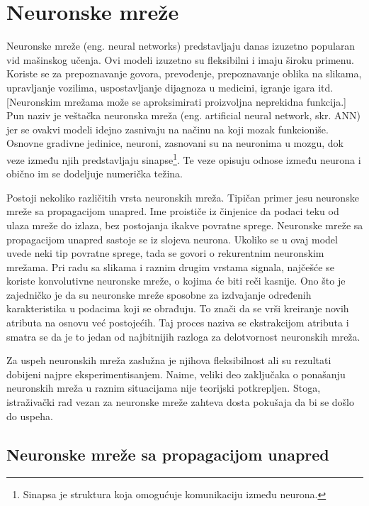 \chapter{Neuronske mreže}
\label{ch:nn}

Neuronske mreže (eng. \foreignlanguage{english}{neural networks}) predstavljaju danas izuzetno popularan vid mašinskog učenja. Ovi modeli izuzetno su fleksibilni i imaju široku primenu.  Koriste se za prepoznavanje govora, prevođenje, prepoznavanje oblika na slikama, upravljanje vozilima, uspostavljanje dijagnoza u medicini, igranje igara itd. [Neuronskim mrežama može se aproksimirati proizvoljna neprekidna funkcija.] Pun naziv je veštačka neuronska mreža (eng. artificial neural network, skr. ANN) jer se ovakvi modeli idejno zasnivaju na načinu na koji mozak funkcioniše. Osnovne gradivne jedinice, neuroni, zasnovani su na neuronima u mozgu, dok veze između njih predstavljaju sinapse\footnote{Sinapsa je struktura koja omogućuje komunikaciju između neurona.}. Te veze opisuju odnose između neurona i obično im se dodeljuje numerička težina.

\par
Postoji nekoliko različitih vrsta neuronskih mreža. Tipičan primer jesu neuronske mreže sa propagacijom unapred. Ime proističe iz činjenice da podaci teku od ulaza mreže do izlaza, bez postojanja ikakve povratne sprege. Neuronske mreže sa propagacijom unapred sastoje se iz slojeva neurona. Ukoliko se u ovaj model uvede neki tip povratne sprege, tada se govori o rekurentnim neuronskim mrežama. Pri radu sa slikama i raznim drugim vrstama signala, najčešće se koriste konvolutivne neuronske mreže, o kojima će biti reči kasnije. Ono što je zajedničko je da su neuronske mreže sposobne za izdvajanje određenih karakteristika u podacima koji se obrađuju. To znači da se vrši kreiranje novih atributa na osnovu već postojećih. Taj proces naziva se ekstrakcijom atributa i smatra se da je to jedan od najbitnijih razloga za delotvornost neuronskih mreža.
\par
Za uspeh neuronskih mreža zaslužna je njihova fleksibilnost ali su rezultati dobijeni najpre eksperimentisanjem. Naime, veliki deo zaključaka o ponašanju neuronskih mreža u raznim situacijama nije teorijski potkrepljen. Stoga, istraživački rad vezan za neuronske mreže zahteva dosta pokušaja da bi se došlo do uspeha.

\section{Neuronske mreže sa propagacijom unapred}

